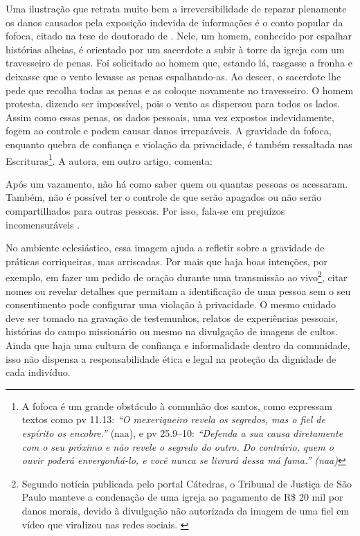 Uma ilustração que retrata muito bem a irreversibilidade de reparar plenamente os danos causados pela exposição indevida de informações é o conto popular da fofoca, citado na tese de doutorado de . Nele, um homem, conhecido por espalhar histórias alheias, é orientado por um sacerdote a subir à torre da igreja com um travesseiro de penas. Foi solicitado ao homem que, estando lá, rasgasse a fronha e deixasse que o vento levasse as penas espalhando-as. Ao descer, o sacerdote lhe pede que recolha todas as penas e as coloque novamente no travesseiro. O homem protesta, dizendo ser impossível, pois o vento as dispersou para todos os lados. Assim como essas penas, os dados pessoais, uma vez expostos indevidamente, fogem ao controle e podem causar danos irreparáveis. A gravidade da fofoca, enquanto quebra de confiança e violação da privacidade, é também ressaltada nas Escrituras\footnote{A fofoca é um grande obstáculo à comunhão dos santos, como expressam textos como \gls{pv} 11.13: \textit{``O mexeriqueiro revela os segredos, mas o fiel de espírito os encobre.''} (\gls{naa}), e \gls{pv} 25.9–10: \textit{``Defenda a sua causa diretamente com o seu próximo e não revele o segredo do outro. Do contrário, quem o ouvir poderá envergonhá-lo, e você nunca se livrará dessa má fama.'' (\gls{naa})}}. A autora, em outro artigo, comenta:

\begin{citacao}
Após um vazamento, não há como saber quem ou quantas pessoas os acessaram. Também, não é possível ter o controle de que serão apagados ou não serão compartilhados para outras pessoas. Por isso, fala-se em prejuízos incomensuráveis \cite{migalhas2023}.
\end{citacao}

No ambiente eclesiástico, essa imagem ajuda a refletir sobre a gravidade de práticas corriqueiras, mas arriscadas. Por mais que haja boas intenções, por exemplo, em fazer um pedido de oração durante uma transmissão ao vivo\footnote{Segundo notícia publicada pelo portal Cátedras, o Tribunal de Justiça de São Paulo manteve a condenação de uma igreja ao pagamento de R\$ 20 mil por danos morais, devido à divulgação não autorizada da imagem de uma fiel em vídeo que viralizou nas redes sociais. \cite{catedras2024}}, citar nomes ou revelar detalhes que permitam a identificação de uma pessoa sem o seu consentimento pode configurar uma violação à privacidade. O mesmo cuidado deve ser tomado na gravação de testemunhos, relatos de experiências pessoais, histórias do campo missionário ou mesmo na divulgação de imagens de cultos. Ainda que haja uma cultura de confiança e informalidade dentro da comunidade, isso não dispensa a responsabilidade ética e legal na proteção da dignidade de cada indivíduo.

